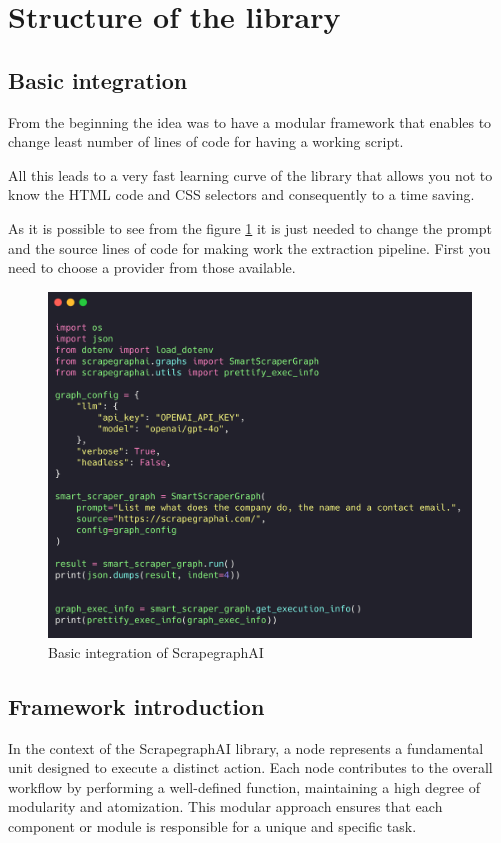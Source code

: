 \section{Structure of the library}
\subsection{Basic integration}

From the beginning the idea was to have a modular framework that enables to change least number of lines of code for having a working script. 

All this leads to a very fast learning curve of the library that allows you not to know the HTML code and CSS selectors and consequently to a time saving.

As it is possible to see from the figure \ref{fig:scrapegraph-script} it is just needed to change the prompt and the source lines of code for making work the extraction pipeline. First you need to choose a provider from those available.

\begin{figure}[H]
    \centering
    \includegraphics[width=0.75\linewidth]{Assets/scrapegraph_integration.png}
    \caption{Basic integration of ScrapegraphAI }
    \label{fig:scrapegraph-script}
\end{figure}

\subsection{Framework introduction}

In the context of the ScrapegraphAI  library, a node represents a fundamental unit designed to execute a distinct action. Each node contributes to the overall workflow by performing a well-defined function, maintaining a high degree of modularity and atomization. This modular approach ensures that each component or module is responsible for a unique and specific task.

